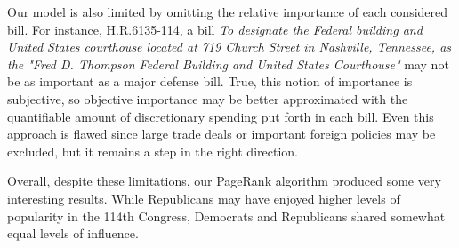 \documentclass[11pt]{article}
\begin{document}
Our model is also limited by omitting the relative importance of each considered bill. For instance, H.R.6135-114, a bill \textit{To designate the Federal building and United States courthouse located at 719 Church Street in Nashville, Tennessee, as the "Fred D. Thompson Federal Building and United States Courthouse"} may not be as important as a major defense bill. True, this notion of importance is subjective, so objective importance may be better approximated with the quantifiable amount of discretionary spending put forth in each bill. Even this approach is flawed since large trade deals or important foreign policies may be excluded, but it remains a step in the right direction.

Overall, despite these limitations, our PageRank algorithm produced some very interesting results. While Republicans may have enjoyed higher levels of popularity in the 114th Congress, Democrats and Republicans shared somewhat equal levels of influence. 









\end{document}
